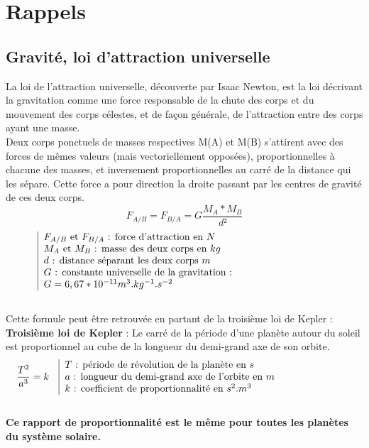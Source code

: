 \documentclass[12pt]{article}
\begin{document}
\tableofcontents
{}
\pagebreak


\section{Rappels}
\subsection{Gravité, loi d'attraction universelle}
La loi de l'attraction universelle, découverte par Isaac Newton, est la loi décrivant la gravitation comme une force responsable de la chute des corps et du mouvement des corps célestes, et de façon générale, de l'attraction entre des corps ayant une masse.
\\
Deux corps ponctuels de masses respectives M(A) et M(B) s'attirent avec des forces de mêmes valeurs (mais vectoriellement opposées), proportionnelles à chacune des masses, et inversement proportionnelles au carré de la distance qui les sépare. Cette force a pour direction la droite passant par les centres de gravité de ces deux corps. 
\\
$$F_{A/B} =F_{B/A} = G\frac{M_{A} * M_{B}}{d²}$$
\begin{align*}
\begin{tabular}{|p{10cm}}
$F_{A/B}$ et $F_{B/A}$ : force d'attraction en $N$ \\
$M_{A}$ et  $M_{B}$  : masse des deux corps en $kg$\\
$d$ : distance séparant les deux corps $m$ \\
$G$ : constante universelle de la gravitation : \\
$G = 6,67*10^{-11} m^{3}.kg^{-1}.s^{-2}$
\end{tabular}
\end{align*}
\\
Cette formule peut être retrouvée en partant de la troisième loi de Kepler : \\
\textbf{Troisième loi de Kepler} : Le carré de la période d'une planète autour du soleil est proportionnel au cube de la longueur du demi-grand axe de son orbite. 
\\
\begin{align*}
\frac{T^2}{a^3} &= k & \begin{tabular}{|p{10cm}}
$T$ : période de révolution de la planète en $s$ \\
$a$ : longueur du demi-grand axe de l'orbite en $m$\\
$k$ : coefficient de proportionnalité en $s^{2}.m^{3}$
\end{tabular}
\end{align*}
\\
\textbf{Ce rapport de proportionnalité est le même pour toutes les planètes du système solaire.}
\pagebreak
\end{document}
